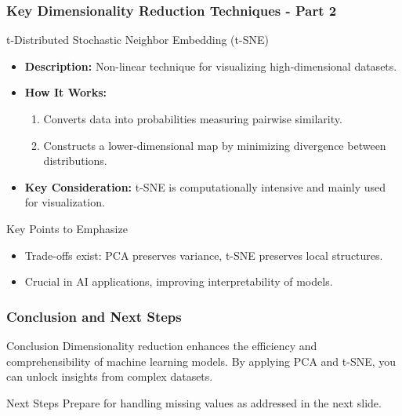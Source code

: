 \documentclass[aspectratio=169]{beamer}
\begin{document}
\begin{frame}[fragile]
    \frametitle{Key Dimensionality Reduction Techniques - Part 2}
    \begin{block}{t-Distributed Stochastic Neighbor Embedding (t-SNE)}
        \begin{itemize}
            \item \textbf{Description:} Non-linear technique for visualizing high-dimensional datasets.
            \item \textbf{How It Works:}
            \begin{enumerate}
                \item Converts data into probabilities measuring pairwise similarity.
                \item Constructs a lower-dimensional map by minimizing divergence between distributions.
            \end{enumerate}
            \item \textbf{Key Consideration:} t-SNE is computationally intensive and mainly used for visualization.
        \end{itemize}
    \end{block}
    
    \begin{block}{Key Points to Emphasize}
        \begin{itemize}
            \item Trade-offs exist: PCA preserves variance, t-SNE preserves local structures.
            \item Crucial in AI applications, improving interpretability of models.
        \end{itemize}
    \end{block}
\end{frame}

\begin{frame}[fragile]
    \frametitle{Conclusion and Next Steps}
    \begin{block}{Conclusion}
        Dimensionality reduction enhances the efficiency and comprehensibility of machine learning models. By applying PCA and t-SNE, you can unlock insights from complex datasets.
    \end{block}
    
    \begin{block}{Next Steps}
        Prepare for handling missing values as addressed in the next slide.
    \end{block}
\end{frame}
\end{document}
